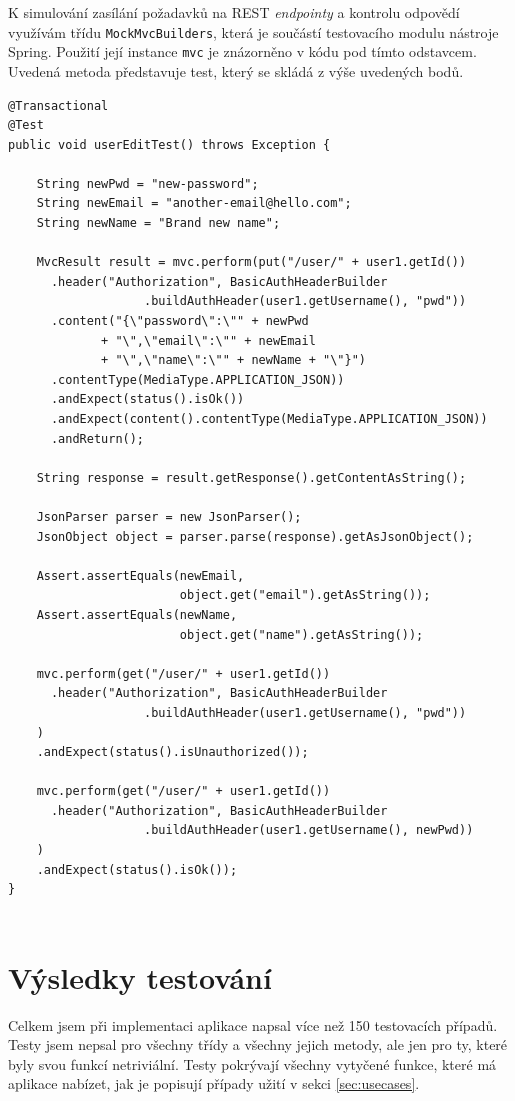 \documentclass[thesis=B,czech]{FITthesis}[2012/06/26]
\begin{document}
			K simulování zasílání požadavků na REST \textit{endpointy} a kontrolu odpovědí využívám třídu \texttt{MockMvcBuilders}, která je součástí testovacího modulu nástroje Spring. Použití její instance \texttt{mvc} je znázorněno v kódu pod tímto odstavcem. Uvedená metoda představuje test, který se skládá z výše uvedených bodů.
			
		\begin{Verbatim}[obeytabs,tabsize=2]
@Transactional
@Test
public void userEditTest() throws Exception {

	String newPwd = "new-password";
	String newEmail = "another-email@hello.com";
	String newName = "Brand new name";
	
	MvcResult result = mvc.perform(put("/user/" + user1.getId())
	  .header("Authorization", BasicAuthHeaderBuilder
                   .buildAuthHeader(user1.getUsername(), "pwd"))
	  .content("{\"password\":\"" + newPwd
	         + "\",\"email\":\"" + newEmail
	         + "\",\"name\":\"" + newName + "\"}")
	  .contentType(MediaType.APPLICATION_JSON))
	  .andExpect(status().isOk())
	  .andExpect(content().contentType(MediaType.APPLICATION_JSON))
	  .andReturn();
	
	String response = result.getResponse().getContentAsString();
	
	JsonParser parser = new JsonParser();
	JsonObject object = parser.parse(response).getAsJsonObject();
	
	Assert.assertEquals(newEmail, 
	                    object.get("email").getAsString());
	Assert.assertEquals(newName, 
	                    object.get("name").getAsString());
	
	mvc.perform(get("/user/" + user1.getId())
	  .header("Authorization", BasicAuthHeaderBuilder
	               .buildAuthHeader(user1.getUsername(), "pwd"))
	)
	.andExpect(status().isUnauthorized());
	
	mvc.perform(get("/user/" + user1.getId())
	  .header("Authorization", BasicAuthHeaderBuilder
	               .buildAuthHeader(user1.getUsername(), newPwd))
	)
	.andExpect(status().isOk());
}
		
		\end{Verbatim}

		
	\section{Výsledky testování}
		Celkem jsem při implementaci aplikace napsal více než 150 testovacích případů. Testy jsem nepsal pro všechny třídy a všechny jejich metody, ale jen pro ty, které byly svou funkcí netriviální. Testy pokrývají všechny vytyčené funkce, které má aplikace nabízet, jak je popisují případy užití v sekci \ref{sec:usecases}. 
		
\end{document}
